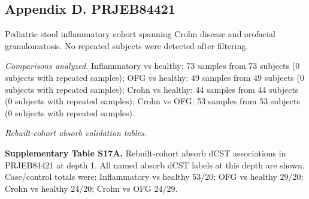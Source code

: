 \subsection*{Appendix D. PRJEB84421}
Pediatric stool inflammatory cohort spanning Crohn disease and orofacial granulomatosis. No repeated subjects were detected after filtering.

\noindent\textit{Comparisons analyzed.} Inflammatory vs healthy: 73 samples from 73 subjects (0 subjects with repeated samples); OFG vs healthy: 49 samples from 49 subjects (0 subjects with repeated samples); Crohn vs healthy: 44 samples from 44 subjects (0 subjects with repeated samples); Crohn vs OFG: 53 samples from 53 subjects (0 subjects with repeated samples).

\noindent\textit{Rebuilt-cohort absorb validation tables.}

\noindent\textbf{Supplementary Table S17A.} Rebuilt-cohort absorb dCST associations in PRJEB84421 at depth 1. All named absorb dCST labels at this depth are shown. Case/control totals were: Inflammatory vs healthy 53/20; OFG vs healthy 29/20; Crohn vs healthy 24/20; Crohn vs OFG 24/29.

